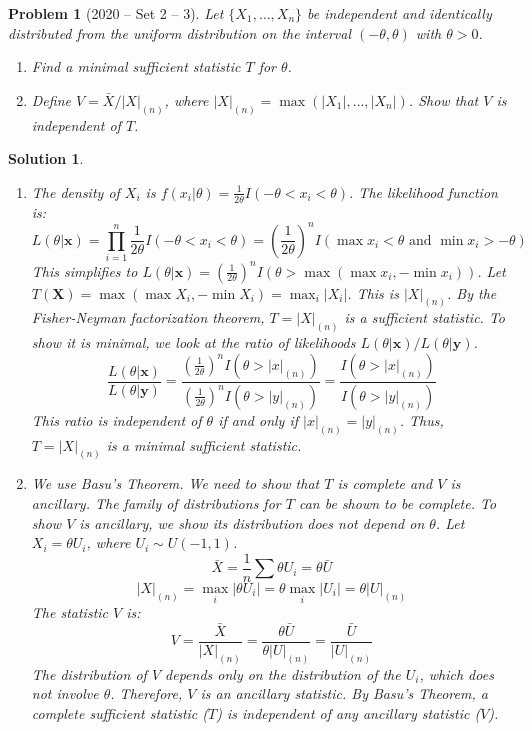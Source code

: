 \documentclass[12pt]{amsart}
\newtheorem{problem}{Problem}
\newtheorem*{solution}{Solution}
\begin{document}
\begin{problem}[2020 -- Set 2 -- 3]
Let $\{X_1, \ldots, X_n\}$ be independent and identically distributed from the uniform distribution on the interval $(-\theta, \theta)$ with $\theta>0$.
\begin{enumerate}[label=(\alph*)]
\item Find a minimal sufficient statistic $T$ for $\theta$.
\item Define $V=\bar{X} /|X|_{(n)}$, where $|X|_{(n)}=\max (|X_1|, \ldots,|X_n|)$. Show that $V$ is independent of $T$.
\end{enumerate}
\end{problem}
\begin{solution}
\begin{enumerate}[label=(\alph*)]
\item The density of $X_i$ is $f(x_i|\theta) = \frac{1}{2\theta}I(-\theta < x_i < \theta)$. The likelihood function is:
$$ L(\theta|\mathbf{x}) = \prod_{i=1}^n \frac{1}{2\theta} I(-\theta < x_i < \theta) = \left(\frac{1}{2\theta}\right)^n I(\max x_i < \theta \text{ and } \min x_i > -\theta) $$
This simplifies to $L(\theta|\mathbf{x}) = \left(\frac{1}{2\theta}\right)^n I(\theta > \max(\max x_i, -\min x_i))$.
Let $T(\mathbf{X}) = \max(\max X_i, -\min X_i) = \max_i |X_i|$. This is $|X|_{(n)}$.
By the Fisher-Neyman factorization theorem, $T=|X|_{(n)}$ is a sufficient statistic.
To show it is minimal, we look at the ratio of likelihoods $L(\theta|\mathbf{x})/L(\theta|\mathbf{y})$.
$$ \frac{L(\theta|\mathbf{x})}{L(\theta|\mathbf{y})} = \frac{(\frac{1}{2\theta})^n I(\theta > |x|_{(n)})}{(\frac{1}{2\theta})^n I(\theta > |y|_{(n)})} = \frac{I(\theta > |x|_{(n)})}{I(\theta > |y|_{(n)})} $$
This ratio is independent of $\theta$ if and only if $|x|_{(n)} = |y|_{(n)}$. Thus, $T=|X|_{(n)}$ is a minimal sufficient statistic.
\item We use Basu's Theorem. We need to show that $T$ is complete and $V$ is ancillary.
The family of distributions for $T$ can be shown to be complete.
To show $V$ is ancillary, we show its distribution does not depend on $\theta$.
Let $X_i = \theta U_i$, where $U_i \sim U(-1,1)$.
$$ \bar{X} = \frac{1}{n} \sum \theta U_i = \theta \bar{U} $$
$$ |X|_{(n)} = \max_i|\theta U_i| = \theta \max_i|U_i| = \theta |U|_{(n)} $$
The statistic $V$ is:
$$ V = \frac{\bar{X}}{|X|_{(n)}} = \frac{\theta \bar{U}}{\theta |U|_{(n)}} = \frac{\bar{U}}{|U|_{(n)}} $$
The distribution of $V$ depends only on the distribution of the $U_i$, which does not involve $\theta$. Therefore, $V$ is an ancillary statistic.
By Basu's Theorem, a complete sufficient statistic ($T$) is independent of any ancillary statistic ($V$).
\end{enumerate}
\end{solution}
\end{document}
